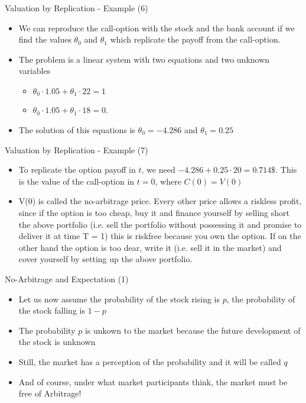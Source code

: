 {Valuation by Replication - Example (6)}
\begin{itemize}
  \item We can reproduce the call-option with the stock and the bank account if we find the values $\theta_0$ and $\theta_1$ which replicate the payoff from the call-option.
  \item The problem is a linear system with two equations and two unknown variables
    \begin{itemize}
    \item $\theta_0 \cdot 1.05 + \theta_1 \cdot 22 = 1$
    \item $\theta_0 \cdot 1.05 + \theta_1 \cdot 18 = 0$.
    \end{itemize}
  \item The solution of this equations is $\theta_0 = -4.286$ and $\theta_1 = 0.25$

\end{itemize}



{Valuation by Replication - Example (7)}
\begin{itemize}
\item To replicate the option payoff in $t$, we need $-4.286+0.25 \cdot 20 = 0.714 \$$. This is the value of the call-option in $t=0$, where $C(0)=V(0)$
\item V(0) is called the no-arbitrage price. Every other price allows a
riskless profit, since if the option is too cheap, buy it and
finance yourself by selling short the above portfolio (i.e. sell the
portfolio without possessing it and promise to deliver it at time
T = 1) this is riskfree because you own the option. If on the
other hand the option is too dear, write it (i.e. sell it in the
market) and cover yourself by setting up the above portfolio.
\end{itemize}



{No-Arbitrage and Expectation (1)}
\begin{itemize}
  \item Let us now assume the probability of the stock rising is $p$, the probability of the stock falling is $1-p$
  \item The probability $p$ is unkown to the market because the future development of the stock is unknown
  \vspace{0.3cm}
  \item Still, the market has a perception of the probability and it will  be called $q$
  \item And of course, under what market participants think, the market must be free of Arbitrage!
\end{itemize}



